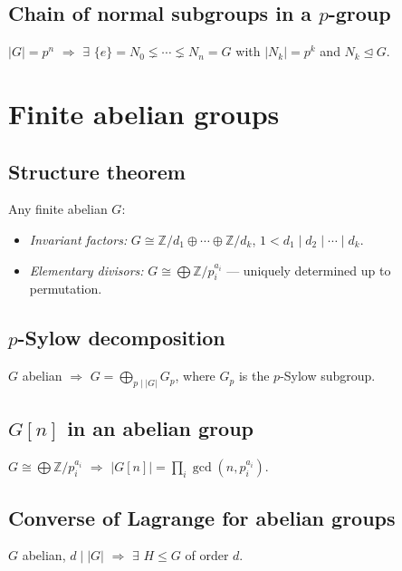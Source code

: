 \subsection{Chain of normal subgroups in a $p$-group}
\label{subsec:pgroup-chain}

$|G|=p^n$ $\Rightarrow$ $\exists$ $\{e\}=N_0\lneq\cdots\lneq N_n=G$ with $|N_k|=p^k$ and $N_k\trianglelefteq G$.

\medskip

\section{Finite abelian groups}
\label{sec:finite-abelian}

\subsection{Structure theorem}
\label{subsec:structure-abelian}

Any finite abelian $G$:
\begin{itemize}
\item \textit{Invariant factors:} $G\cong\mathbb{Z}/d_1\oplus\cdots\oplus\mathbb{Z}/d_k$, $1<d_1\mid d_2\mid\cdots\mid d_k$.
\item \textit{Elementary divisors:} $G\cong\bigoplus\mathbb{Z}/p_i^{a_i}$ --- uniquely determined up to permutation.
\end{itemize}

\subsection{$p$-Sylow decomposition}
\label{subsec:p-sylow-abelian}

$G$ abelian $\Rightarrow$ $G=\bigoplus_{p\mid|G|}G_p$, where $G_p$ is the $p$-Sylow subgroup.

\subsection{$G[n]$ in an abelian group}
\label{subsec:g-n-abelian}

$G\cong\bigoplus\mathbb{Z}/p_i^{a_i}$ $\Rightarrow$ $|G[n]|=\prod_i\gcd(n,p_i^{a_i})$.

\subsection{Converse of Lagrange for abelian groups}
\label{subsec:converse-lagrange}

$G$ abelian, $d\mid|G|$ $\Rightarrow$ $\exists$ $H\le G$ of order $d$.

